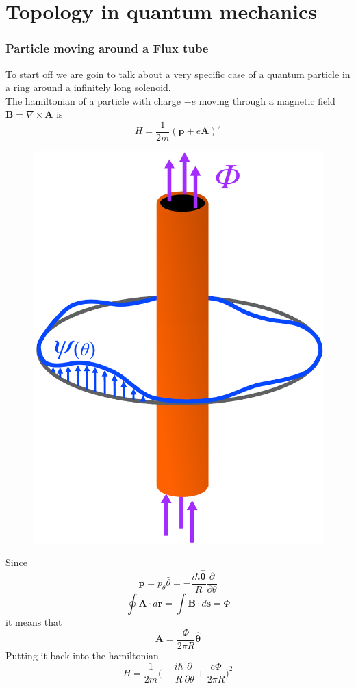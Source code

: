 \chapter{Topology in quantum mechanics}
\label{sec:no_flat}
\subsection*{Particle moving around a Flux tube}
    
        
        To start off we are goin to talk about a very specific case of a quantum particle in a ring around a infinitely long solenoid.\\
        The hamiltonian of a particle with charge $-e$ moving through a magnetic field $\mathbf B= \nabla \times \mathbf A$ is
        \begin{equation} \label{EMHamiltonian}
                H=\frac 1{2m}(\mathbf p + e\mathbf A)^2 
        \end{equation}
        \begin{figure}
            \includegraphics[width=.4\textwidth]{Immagini/topo/solenoid.pdf}
        \end{figure} 
        Since 
        \[\mathbf p=p_\theta \hat\theta=-\frac{i\hbar\mathbf {\hat \theta}}{R}\frac\partial {\partial \theta}\]
        \[
            \oint \mathbf A\cdot d\mathbf r=\int \mathbf B\cdot d\mathbf s = \Phi
        \]   
        it means that
        \begin{equation} \label{vector_potential}
            \mathbf A=\frac \Phi{2\pi R} \mathbf {\hat \theta}
        \end{equation}
        Putting it back into the hamiltonian
        \begin{equation} \label{EMHamiltonian2}
            H=\frac 1{2m}\bigg(-\frac{i\hbar}{R}\frac\partial {\partial \theta} + \frac{e\Phi}{2\pi R}\bigg)^2 
        \end{equation}
